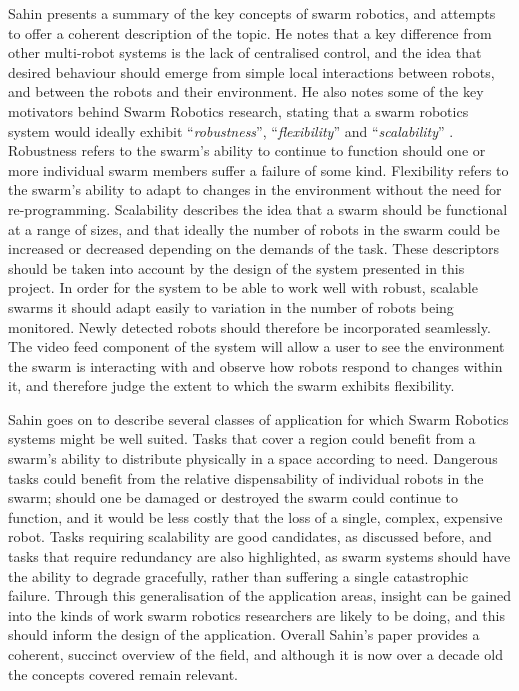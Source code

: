 Sahin \cite{Sahin:2004} presents a summary of the key concepts of swarm robotics, and attempts to offer a coherent description of the topic. He notes that a key difference from other multi-robot systems is the lack of centralised control, and the idea that desired behaviour should emerge from simple local interactions between robots, and between the robots and their environment. He also notes some of the key motivators behind Swarm Robotics research, stating that a swarm robotics system would ideally exhibit ``\textit{robustness}'', ``\textit{flexibility}'' and ``\textit{scalability}'' \cite{Sahin:2004}. Robustness refers to the swarm's ability to continue to function should one or more individual swarm members suffer a failure of some kind. Flexibility refers to the swarm's ability to adapt to changes in the environment without the need for re-programming. Scalability describes the idea that a swarm should be functional at a range of sizes, and that ideally the number of robots in the swarm could be increased or decreased depending on the demands of the task. These descriptors should be taken into account by the design of the system presented in this project. In order for the system to be able to work well with robust, scalable swarms it should adapt easily to variation in the number of robots being monitored. Newly detected robots should therefore be incorporated seamlessly. The video feed component of the system will allow a user to see the environment the swarm is interacting with and observe how robots respond to changes within it, and therefore judge the extent to which the swarm exhibits flexibility.

Sahin \cite{Sahin:2004} goes on to describe several classes of application for which Swarm Robotics systems might be well suited. Tasks that cover a region could benefit from a swarm's ability to distribute physically in a space according to need. Dangerous tasks could benefit from the relative dispensability of individual robots in the swarm; should one be damaged or destroyed the swarm could continue to function, and it would be less costly that the loss of a single, complex, expensive robot. Tasks requiring scalability are good candidates, as discussed before, and tasks that require redundancy are also highlighted, as swarm systems should have the ability to degrade gracefully, rather than suffering a single catastrophic failure. Through this generalisation of the application areas, insight can be gained into the kinds of work swarm robotics researchers are likely to be doing, and this should inform the design of the application. Overall Sahin's paper \cite{Sahin:2004} provides a coherent, succinct overview of the field, and although it is now over a decade old the concepts covered remain relevant.

